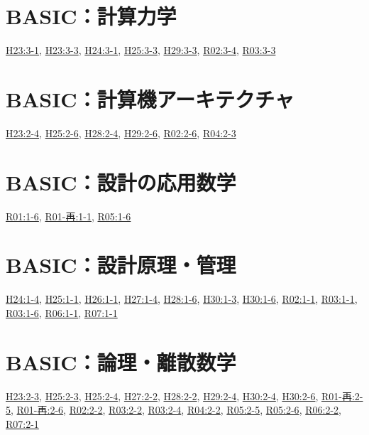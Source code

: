 \section{BASIC：計算力学}
\hyperref[q:h23-reg-basic-3-1]{H23:3-1}, \hyperref[q:h23-reg-basic-3-3]{H23:3-3}, \hyperref[q:h24-reg-basic-3-1]{H24:3-1}, \hyperref[q:h25-reg-basic-3-3]{H25:3-3}, \hyperref[q:h29-reg-basic-3-3]{H29:3-3}, \hyperref[q:r02-reg-basic-3-4]{R02:3-4}, \hyperref[q:r03-reg-basic-3-3]{R03:3-3}
\section{BASIC：計算機アーキテクチャ}
\hyperref[q:h23-reg-basic-2-4]{H23:2-4}, \hyperref[q:h25-reg-basic-2-6]{H25:2-6}, \hyperref[q:h28-reg-basic-2-4]{H28:2-4}, \hyperref[q:h29-reg-basic-2-6]{H29:2-6}, \hyperref[q:r02-reg-basic-2-6]{R02:2-6}, \hyperref[q:r04-reg-basic-2-3]{R04:2-3}
\section{BASIC：設計の応用数学}
\hyperref[q:r01-reg-basic-1-6]{R01:1-6}, \hyperref[q:r01-ret-basic-1-1]{R01-再:1-1}, \hyperref[q:r05-reg-basic-1-6]{R05:1-6}
\section{BASIC：設計原理・管理}
\hyperref[q:h24-reg-basic-1-4]{H24:1-4}, \hyperref[q:h25-reg-basic-1-1]{H25:1-1}, \hyperref[q:h26-reg-basic-1-1]{H26:1-1}, \hyperref[q:h27-reg-basic-1-4]{H27:1-4}, \hyperref[q:h28-reg-basic-1-6]{H28:1-6}, \hyperref[q:h30-reg-basic-1-3]{H30:1-3}, \hyperref[q:h30-reg-basic-1-6]{H30:1-6}, \hyperref[q:r02-reg-basic-1-1]{R02:1-1}, \hyperref[q:r03-reg-basic-1-1]{R03:1-1}, \hyperref[q:r03-reg-basic-1-6]{R03:1-6}, \hyperref[q:r06-reg-basic-1-1]{R06:1-1}, \hyperref[q:r07-reg-basic-1-1]{R07:1-1}
\section{BASIC：論理・離散数学}
\hyperref[q:h23-reg-basic-2-3]{H23:2-3}, \hyperref[q:h25-reg-basic-2-3]{H25:2-3}, \hyperref[q:h25-reg-basic-2-4]{H25:2-4}, \hyperref[q:h27-reg-basic-2-2]{H27:2-2}, \hyperref[q:h28-reg-basic-2-2]{H28:2-2}, \hyperref[q:h29-reg-basic-2-4]{H29:2-4}, \hyperref[q:h30-reg-basic-2-4]{H30:2-4}, \hyperref[q:h30-reg-basic-2-6]{H30:2-6}, \hyperref[q:r01-ret-basic-2-5]{R01-再:2-5}, \hyperref[q:r01-ret-basic-2-6]{R01-再:2-6}, \hyperref[q:r02-reg-basic-2-2]{R02:2-2}, \hyperref[q:r03-reg-basic-2-2]{R03:2-2}, \hyperref[q:r03-reg-basic-2-4]{R03:2-4}, \hyperref[q:r04-reg-basic-2-2]{R04:2-2}, \hyperref[q:r05-reg-basic-2-5]{R05:2-5}, \hyperref[q:r05-reg-basic-2-6]{R05:2-6}, \hyperref[q:r06-reg-basic-2-2]{R06:2-2}, \hyperref[q:r07-reg-basic-2-1]{R07:2-1}
